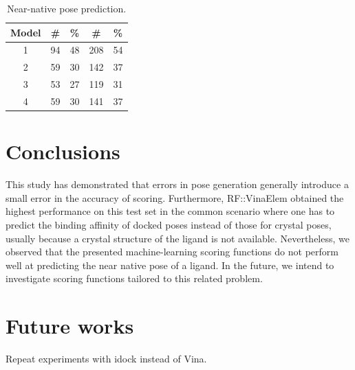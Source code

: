 \begin{table}
\caption{Near-native pose prediction.}
\label{rfscore4:near-native}
\begin{tabular}{ccccc}
\hline
Model & \# & \% & \# & \%\\
\hline
1 & 94 & 48 & 208 & 54\\
2 & 59 & 30 & 142 & 37\\
3 & 53 & 27 & 119 & 31\\
4 & 59 & 30 & 141 & 37\\
\hline
\end{tabular}
\end{table}

\section{Conclusions}

This study has demonstrated that errors in pose generation generally introduce a small error in the accuracy of scoring. Furthermore, RF::VinaElem obtained the highest performance on this test set in the common scenario where one has to predict the binding affinity of docked poses instead of those for crystal poses, usually because a crystal structure of the ligand is not available. Nevertheless, we observed that the presented machine-learning scoring functions do not perform well at predicting the near native pose of a ligand. In the future, we intend to investigate scoring functions tailored to this related problem.

\section{Future works}

Repeat experiments with idock instead of Vina.

\chapterend
